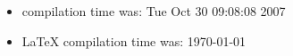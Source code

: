 \documentclass{article}
\begin{document}
\begin{itemize}
  \item \Rlogo{} compilation time was: Tue Oct 30 09:08:08 2007
  \item \LaTeX{} compilation time was: \today
\end{itemize}


\clearpage
{}


\end{document}
